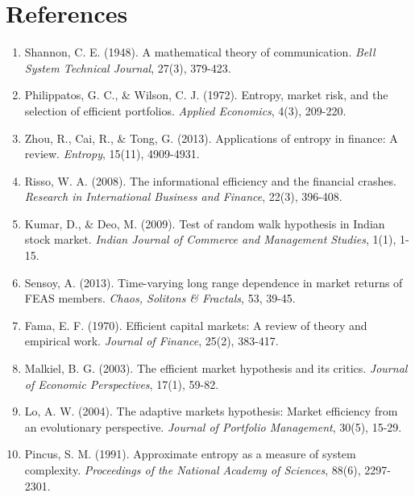 \documentclass[12pt,a4paper]{article}
\begin{document}
\section{References}

\begin{enumerate}
    \item Shannon, C. E. (1948). A mathematical theory of communication. \textit{Bell System Technical Journal}, 27(3), 379-423.
    
    \item Philippatos, G. C., \& Wilson, C. J. (1972). Entropy, market risk, and the selection of efficient portfolios. \textit{Applied Economics}, 4(3), 209-220.
    
    \item Zhou, R., Cai, R., \& Tong, G. (2013). Applications of entropy in finance: A review. \textit{Entropy}, 15(11), 4909-4931.
    
    \item Risso, W. A. (2008). The informational efficiency and the financial crashes. \textit{Research in International Business and Finance}, 22(3), 396-408.
    
    \item Kumar, D., \& Deo, M. (2009). Test of random walk hypothesis in Indian stock market. \textit{Indian Journal of Commerce and Management Studies}, 1(1), 1-15.
    
    \item Sensoy, A. (2013). Time-varying long range dependence in market returns of FEAS members. \textit{Chaos, Solitons \& Fractals}, 53, 39-45.
    
    \item Fama, E. F. (1970). Efficient capital markets: A review of theory and empirical work. \textit{Journal of Finance}, 25(2), 383-417.
    
    \item Malkiel, B. G. (2003). The efficient market hypothesis and its critics. \textit{Journal of Economic Perspectives}, 17(1), 59-82.
    
    \item Lo, A. W. (2004). The adaptive markets hypothesis: Market efficiency from an evolutionary perspective. \textit{Journal of Portfolio Management}, 30(5), 15-29.
    
    \item Pincus, S. M. (1991). Approximate entropy as a measure of system complexity. \textit{Proceedings of the National Academy of Sciences}, 88(6), 2297-2301.
\end{enumerate}
\end{document}
